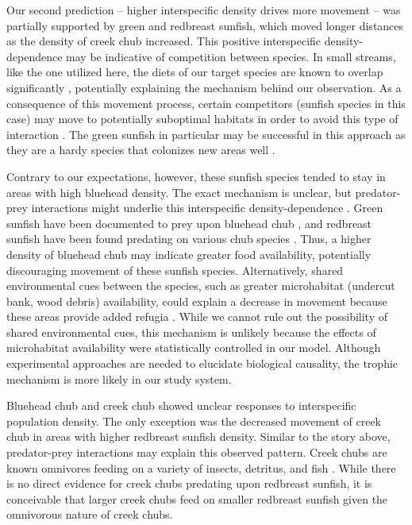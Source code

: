\documentclass[11pt, class=article, crop=false]{standalone}
\begin{document}
Our second prediction -- higher interspecific density drives more movement -- was partially supported by green and redbreast sunfish, which moved longer distances as the density of creek chub increased. This positive interspecific density-dependence may be indicative of competition between species.
In small streams, like the one utilized here, the diets of our target species are known to overlap significantly \citep{collarPISCIVORYLIMITSDIVERSIFICATION2009, lemlySuppressionNativeFish1985, karrAssessmentBioticIntegrity1981, leonardApplicationTestingIndex1986}, potentially explaining the mechanism behind our observation.  
As a consequence of this movement process, certain competitors (sunfish species in this case) may move to potentially suboptimal habitats in order to avoid this type of interaction \citep{jacobHabitatChoiceMeets2018, thierryInterplayAbioticBiotic2024}. 
The green sunfish in particular may be successful in this approach as they are a hardy species that colonizes new areas well \citep{lemlySuppressionNativeFish1985, moyleInlandFishesCalifornia2002}.

Contrary to our expectations, however, these sunfish species tended to stay in areas with high bluehead density. The exact mechanism is unclear, but predator-prey interactions might underlie this interspecific density-dependence \citep{jacobHabitatMatchingSpatial2015}. Green sunfish have been documented to prey upon bluehead chub \citep{lemlySuppressionNativeFish1985}, and redbreast sunfish have been found predating on various chub species \citep{borrelliPuttingLakeTogether2023}. Thus, a higher density of bluehead chub may indicate greater food availability, potentially discouraging movement of these sunfish species. Alternatively, shared environmental cues between the species, such as greater microhabitat (undercut bank, wood debris) availability, could explain a decrease in movement because these areas provide added refugia \citep{careyEffectsLittoralHabitat2010}. While we cannot rule out the possibility of shared environmental cues, this mechanism is unlikely because the effects of microhabitat availability were statistically controlled in our model. Although experimental approaches are needed to elucidate biological causality, the trophic mechanism is more likely in our study system. 

Bluehead chub and creek chub showed unclear responses to interspecific population density. The only exception was the decreased movement of creek chub in areas with higher redbreast sunfish density. Similar to the story above, predator-prey interactions may explain this observed pattern. Creek chubs are known omnivores feeding on a variety of insects, detritus, and fish \citep{champagneRiparianBuffersMaintain2022, leonardApplicationTestingIndex1986, quistSummerFoodHabits2006}. While there is no direct evidence for creek chubs predating upon redbreast sunfish, it is conceivable that larger creek chubs feed on smaller redbreast sunfish given the omnivorous nature of creek chubs.
\end{document}
